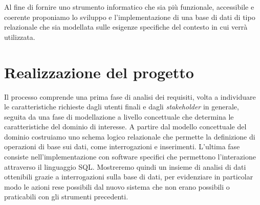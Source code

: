 Al fine di fornire uno strumento informatico che sia più funzionale, accessibile e coerente proponiamo lo sviluppo e l'implementazione di una base di dati di tipo relazionale che sia modellata sulle esigenze specifiche del contesto in cui verrà utilizzata.

\section{Realizzazione del progetto}

Il processo comprende una prima fase di analisi dei requisiti, volta a individuare le caratteristiche richieste dagli utenti finali e dagli \emph{stakeholder} in generale, seguita da una fase di modellazione a livello concettuale che determina le caratteristiche del dominio di interesse.
A partire dal modello concettuale del dominio costruiamo uno schema logico relazionale che permette la definizione di operazioni di base sui dati, come interrogazioni e inserimenti.
L'ultima fase consiste nell'implementazione con software specifici che permettono l'interazione attraverso il linguaggio SQL.
Mostreremo quindi un insieme di analisi di dati ottenibili grazie a interrogazioni sulla base di dati, per evidenziare in particolar modo le azioni rese possibili dal nuovo sistema che non erano possibili o praticabili con gli strumenti precedenti.

